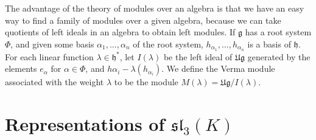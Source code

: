 The advantage of the theory of modules over an algebra is that we have an easy way to find a family of modules over a given algebra, because we can take quotients of left ideals in an algebra to obtain left modules. If $\mathfrak{g}$ has a root system $\Phi$, and given some basis $\alpha_1, \dots, \alpha_n$ of the root system, $h_{\alpha_1}, \dots, h_{\alpha_n}$ is a basis of $\mathfrak{h}$. For each linear function $\lambda \in \mathfrak{h}^*$, let $I(\lambda)$ be the left ideal of $\mathfrak{Ug}$ generated by the elements $e_\alpha$ for $\alpha \in \Phi$, and $h{\alpha_i} - \lambda(h_{\alpha_i})$. We define the {Verma module} associated with the weight $\lambda$ to be the module $M(\lambda) = \mathfrak{Ug}/I(\lambda)$.

\begin{theorem}
    
\end{theorem}

\section{Representations of $\mathfrak{sl}_3(K)$}

